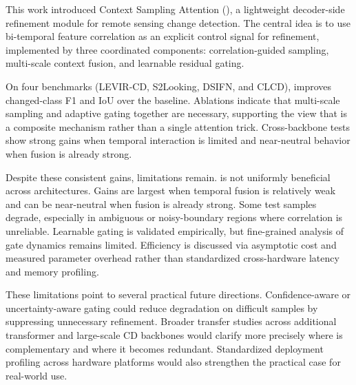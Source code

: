 This work introduced Context Sampling Attention (\cosa{}), a lightweight decoder-side refinement module for remote sensing change detection. The central idea is to use bi-temporal feature correlation as an explicit control signal for refinement, implemented by three coordinated components: correlation-guided sampling, multi-scale context fusion, and learnable residual gating.

On four benchmarks (LEVIR-CD, S2Looking, DSIFN, and CLCD), \cosa{} improves changed-class F1 and IoU over the baseline. Ablations indicate that multi-scale sampling and adaptive gating together are necessary, supporting the view that \cosa{} is a composite mechanism rather than a single attention trick. Cross-backbone tests show strong gains when temporal interaction is limited and near-neutral behavior when fusion is already strong.

Despite these consistent gains, limitations remain. \cosa{} is not uniformly beneficial across architectures. Gains are largest when temporal fusion is relatively weak and can be near-neutral when fusion is already strong. Some test samples degrade, especially in ambiguous or noisy-boundary regions where correlation is unreliable. Learnable gating is validated empirically, but fine-grained analysis of gate dynamics remains limited. Efficiency is discussed via asymptotic cost and measured parameter overhead rather than standardized cross-hardware latency and memory profiling.

These limitations point to several practical future directions. Confidence-aware or uncertainty-aware gating could reduce degradation on difficult samples by suppressing unnecessary refinement. Broader transfer studies across additional transformer and large-scale CD backbones would clarify more precisely where \cosa{} is complementary and where it becomes redundant. Standardized deployment profiling across hardware platforms would also strengthen the practical case for real-world use.
\EOD
